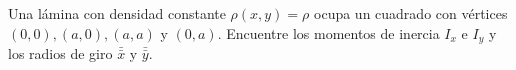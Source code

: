 \item Una lámina con densidad constante $\rho(x, y) = \rho$ ocupa un cuadrado con vértices $(0, 0), (a, 0), (a, a)$ y $(0, a)$. Encuentre los momentos de inercia $I_x$ e $I_y$ y los radios de giro $\bar{\bar{x}}$ y $\bar{\bar{y}}$.
